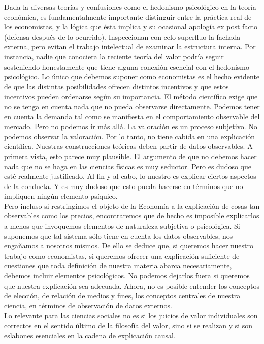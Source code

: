  Dada la diversas teorías y confusiones como el hedonismo psicológico en la teoría económica, es fundamentalmente importante distinguir entre la práctica real de los economistas, y la lógica que ésta implica y su ocasional apología ex post facto (defensa después de lo ocurrido). Inspeccionan con celo superfluo la fachada externa, pero evitan el trabajo intelectual de examinar la estructura interna. Por instancia, nadie que conociera la reciente teoría del valor podría seguir sosteniendo honestamente que tiene alguna conexión esencial con el hedonismo psicológico. Lo único que debemos suponer como economistas es el hecho evidente de que las distintas posibilidades ofrecen distintos incentivos y que estos incentivos pueden ordenarse según su importancia. El método científico exige que no se tenga en cuenta nada que no pueda observarse directamente. Podemos tener en cuenta la demanda tal como se manifiesta en el comportamiento observable del mercado. Pero no podemos ir más allá. La valoración es un proceso subjetivo. No podemos observar la valoración. Por lo tanto, no tiene cabida en una explicación científica. Nuestras construcciones teóricas deben partir de datos observables. A primera vista, esto parece muy plausible. El argumento de que no debemos hacer nada que no se haga en las ciencias físicas es muy seductor. Pero es dudoso que esté realmente justificado. Al fin y al cabo, lo nuestro es explicar ciertos aspectos de la conducta. Y es muy dudoso que esto pueda hacerse en términos que no impliquen ningún elemento psíquico.\\

 Pero incluso si restringimos el objeto de la Economía a la explicación de cosas tan observables como los precios, encontraremos que de hecho es imposible explicarlos a menos que invoquemos elementos de naturaleza subjetiva o psicológica. Si suponemos que tal sistema sólo tiene en cuenta los datos observables, nos engañamos a nosotros mismos. De ello se deduce que, si queremos hacer nuestro trabajo como economistas, si queremos ofrecer una explicación suficiente de cuestiones que toda definición de nuestra materia abarca necesariamente, debemos incluir elementos psicológicos. No podemos dejarlos fuera si queremos que nuestra explicación sea adecuada. Ahora, no es posible entender los conceptos de elección, de relación de medios y fines, los conceptos centrales de nuestra ciencia, en términos de observación de datos externos. \\

 Lo relevante para las ciencias sociales no es si los juicios de valor individuales son correctos en el sentido último de la filosofía del valor, sino si se realizan y si son eslabones esenciales en la cadena de explicación causal.

